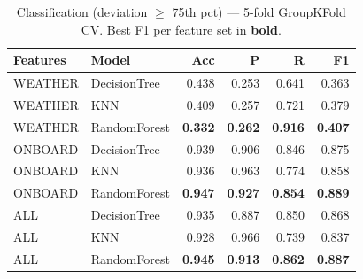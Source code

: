 \begin{table}[t]
\centering
\caption{Classification (deviation $\ge$ 75th pct) --- 5-fold GroupKFold CV. Best F1 per feature set in \textbf{bold}.}
\label{tab:cls_final}
\begin{tabular}{llrrrr}
\toprule
Features & Model & Acc & P & R & F1 \\
\midrule
WEATHER & DecisionTree & 0.438 & 0.253 & 0.641 & 0.363 \\
WEATHER & KNN & 0.409 & 0.257 & 0.721 & 0.379 \\
WEATHER & RandomForest & \textbf{0.332} & \textbf{0.262} & \textbf{0.916} & \textbf{0.407} \\
\midrule
ONBOARD & DecisionTree & 0.939 & 0.906 & 0.846 & 0.875 \\
ONBOARD & KNN & 0.936 & 0.963 & 0.774 & 0.858 \\
ONBOARD & RandomForest & \textbf{0.947} & \textbf{0.927} & \textbf{0.854} & \textbf{0.889} \\
\midrule
ALL & DecisionTree & 0.935 & 0.887 & 0.850 & 0.868 \\
ALL & KNN & 0.928 & 0.966 & 0.739 & 0.837 \\
ALL & RandomForest & \textbf{0.945} & \textbf{0.913} & \textbf{0.862} & \textbf{0.887} \\
\midrule
\bottomrule
\end{tabular}
\end{table}
